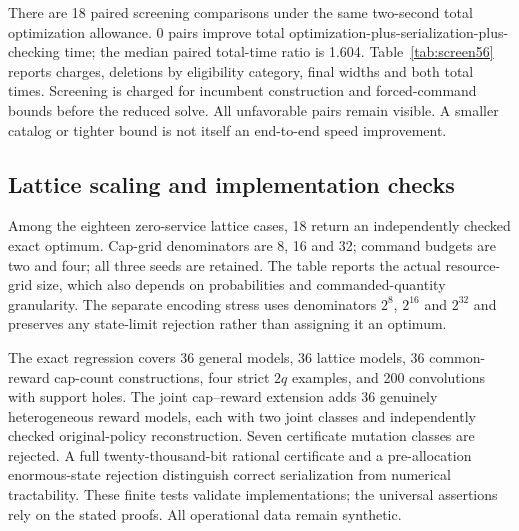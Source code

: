 There are 18 paired screening comparisons under the same two-second total optimization allowance. 0 pairs improve total optimization-plus-serialization-plus-checking time; the median paired total-time ratio is 1.604. Table~\ref{tab:screen56} reports charges, deletions by eligibility category, final widths and both total times. Screening is charged for incumbent construction and forced-command bounds before the reduced solve. All unfavorable pairs remain visible. A smaller catalog or tighter bound is not itself an end-to-end speed improvement.

\subsection{Lattice scaling and implementation checks}
Among the eighteen zero-service lattice cases, 18 return an independently checked exact optimum. Cap-grid denominators are 8, 16 and 32; command budgets are two and four; all three seeds are retained. The table reports the actual resource-grid size, which also depends on probabilities and commanded-quantity granularity. The separate encoding stress uses denominators $2^8$, $2^{16}$ and $2^{32}$ and preserves any state-limit rejection rather than assigning it an optimum.

The exact regression covers 36 general models, 36 lattice models, 36 common-reward cap-count constructions, four strict $2q$ examples, and 200 convolutions with support holes. The joint cap--reward extension adds 36 genuinely heterogeneous reward models, each with two joint classes and independently checked original-policy reconstruction. Seven certificate mutation classes are rejected. A full twenty-thousand-bit rational certificate and a pre-allocation enormous-state rejection distinguish correct serialization from numerical tractability. These finite tests validate implementations; the universal assertions rely on the stated proofs. All operational data remain synthetic.
